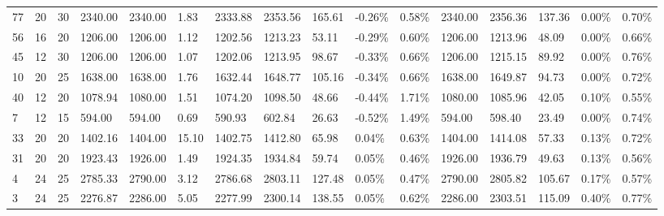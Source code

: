 \documentclass[../main]{subfiles}
\begin{document}
\begin{longtable}{l|ll|lll|lllll|lllll}
   77 & 20                         & 30                         & 2340.00                   & 2340.00     & 1.83                & 2333.88 & 2353.56 & 165.61 & -0.26\% & 0.58\% & 2340.00 & 2356.36 & 137.36 & 0.00\%  & 0.70\% \\
   56 & 16                         & 20                         & 1206.00                   & 1206.00     & 1.12                & 1202.56 & 1213.23 & 53.11  & -0.29\% & 0.60\% & 1206.00 & 1213.96 & 48.09  & 0.00\%  & 0.66\% \\
   45 & 12                         & 30                         & 1206.00                   & 1206.00     & 1.07                & 1202.06 & 1213.95 & 98.67  & -0.33\% & 0.66\% & 1206.00 & 1215.15 & 89.92  & 0.00\%  & 0.76\% \\
   10 & 20                         & 25                         & 1638.00                   & 1638.00     & 1.76                & 1632.44 & 1648.77 & 105.16 & -0.34\% & 0.66\% & 1638.00 & 1649.87 & 94.73  & 0.00\%  & 0.72\% \\
   40 & 12                         & 20                         & 1078.94                   & 1080.00     & 1.51                & 1074.20 & 1098.50 & 48.66  & -0.44\% & 1.71\% & 1080.00 & 1085.96 & 42.05  & 0.10\%  & 0.55\% \\
   7  & 12                         & 15                         & 594.00                    & 594.00      & 0.69                & 590.93  & 602.84  & 26.63  & -0.52\% & 1.49\% & 594.00  & 598.40  & 23.49  & 0.00\%  & 0.74\% \\
   33 & 20                         & 20                         & 1402.16                   & 1404.00     & 15.10               & 1402.75 & 1412.80 & 65.98  & 0.04\%  & 0.63\% & 1404.00 & 1414.08 & 57.33  & 0.13\%  & 0.72\% \\
   31 & 20                         & 20                         & 1923.43                   & 1926.00     & 1.49                & 1924.35 & 1934.84 & 59.74  & 0.05\%  & 0.46\% & 1926.00 & 1936.79 & 49.63  & 0.13\%  & 0.56\% \\
   4  & 24                         & 25                         & 2785.33                   & 2790.00     & 3.12                & 2786.68 & 2803.11 & 127.48 & 0.05\%  & 0.47\% & 2790.00 & 2805.82 & 105.67 & 0.17\%  & 0.57\% \\
   3  & 24                         & 25                         & 2276.87                   & 2286.00     & 5.05                & 2277.99 & 2300.14 & 138.55 & 0.05\%  & 0.62\% & 2286.00 & 2303.51 & 115.09 & 0.40\%  & 0.77\% \\

\end{longtable}
\end{document}
